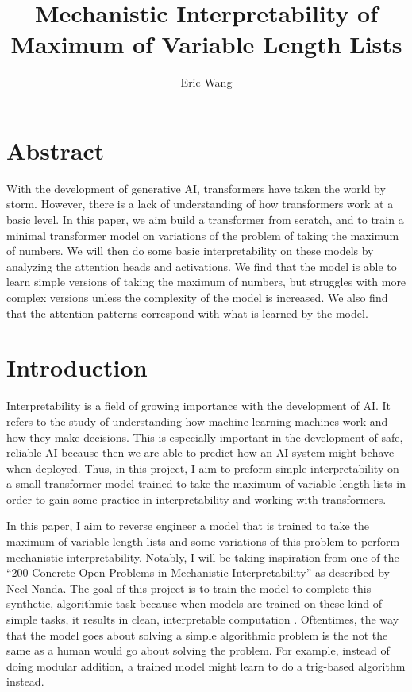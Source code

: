 \documentclass{article}
\title{Mechanistic Interpretability of Maximum of Variable Length Lists}
\author{Eric Wang}
\begin{document}
\maketitle

\section{Abstract}
With the development of generative AI, transformers have taken the world by storm. However, there is a lack of understanding of how transformers work at a basic level. In this paper, we aim build a transformer from scratch, and to train a minimal transformer model on variations of the problem of taking the maximum of numbers. We will then do some basic interpretability on these models by analyzing the attention heads and activations. We find that the model is able to learn simple versions of taking the maximum of numbers, but struggles with more complex versions unless the complexity of the model is increased. We also find that the attention patterns correspond with what is learned by the model.

\section{Introduction}

Interpretability is a field of growing importance with the development of AI. It refers to the study of understanding how machine learning machines work and how they make decisions. This is especially important in the development of safe, reliable AI because then we are able to predict how an AI system might behave when deployed. Thus, in this project, I aim to preform simple interpretability on a small transformer model trained to take the maximum of variable length lists in order to gain some practice in interpretability and working with transformers.

In this paper, I aim to reverse engineer a model that is trained to take the maximum of variable length lists and some variations of this problem to perform mechanistic interpretability. Notably, I will be taking inspiration from one of the ``200 Concrete Open Problems in Mechanistic Interpretability'' as described by Neel Nanda. The goal of this project is to train the model to complete this synthetic, algorithmic task because when models are trained on these kind of simple tasks, it results in clean, interpretable computation \cite{1}. Oftentimes, the way that the model goes about solving a simple algorithmic problem is the not the same as a human would go about solving the problem. For example, instead of doing modular addition, a trained model might learn to do a trig-based algorithm instead.
\end{document}
